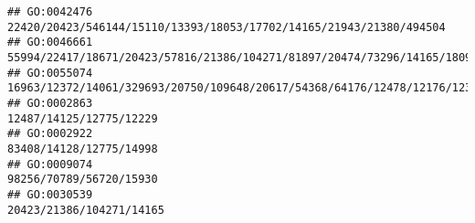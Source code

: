 \documentclass[
]{article}
\begin{document}
\begin{verbatim}
## GO:0042476                                                                                                                                                                                                                                                                                                                                          22420/20423/546144/15110/13393/18053/17702/14165/21943/21380/494504
## GO:0046661                                                                                                                                                                                                                                                                                                                         55994/22417/18671/20423/57816/21386/104271/81897/20474/73296/14165/18095/13078/14585
## GO:0055074                                                                                                                                                                                                                                                                                   16963/12372/14061/329693/20750/109648/20617/54368/64176/12478/12176/12308/23832/20307/20304/214189/21943/22337/14126/12766
## GO:0002863                                                                                                                                                                                                                                                                                                                                                                                      12487/14125/12775/12229
## GO:0002922                                                                                                                                                                                                                                                                                                                                                                                      83408/14128/12775/14998
## GO:0009074                                                                                                                                                                                                                                                                                                                                                                                      98256/70789/56720/15930
## GO:0030539                                                                                                                                                                                                                                                                                                                                                                                     20423/21386/104271/14165

\end{verbatim}
\end{document}
